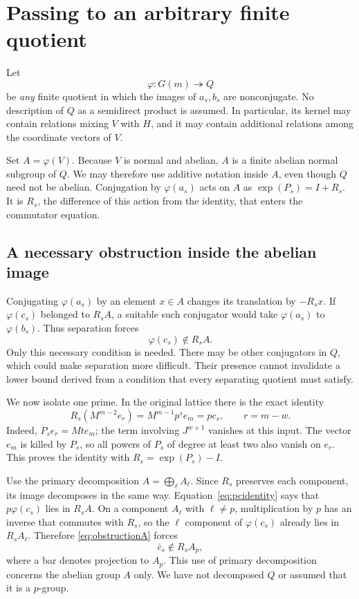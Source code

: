 \documentclass[11pt]{article}
\numberwithin{equation}{section}
\theoremstyle{definition}
\theoremstyle{remark}
\begin{document}
\section{Passing to an arbitrary finite quotient}\label{sec:arbitrary}
Let
\[
\varphi:G(m)\twoheadrightarrow Q
\]
be \emph{any} finite quotient in which the images of $a_s,b_s$ are nonconjugate. No description of $Q$ as a semidirect product is assumed. In particular, its kernel may contain relations mixing $V$ with $H$, and it may contain additional relations among the coordinate vectors of $V$.

Set $A=\varphi(V)$. Because $V$ is normal and abelian, $A$ is a finite abelian normal subgroup of $Q$. We may therefore use additive notation inside $A$, even though $Q$ need not be abelian. Conjugation by $\varphi(a_s)$ acts on $A$ as $\exp(P_s)=I+R_s$. It is $R_s$, the difference of this action from the identity, that enters the commutator equation.

\subsection{A necessary obstruction inside the abelian image}
Conjugating $\varphi(a_s)$ by an element $x\in A$ changes its translation by $-R_sx$. If $\varphi(c_s)$ belonged to $R_sA$, a suitable such conjugator would take $\varphi(a_s)$ to $\varphi(b_s)$. Thus separation forces
\begin{equation}\label{eq:obstructionA}
\varphi(c_s)\notin R_sA.
\end{equation}
Only this necessary condition is needed. There may be other conjugators in $Q$, which could make separation more difficult. Their presence cannot invalidate a lower bound derived from a condition that every separating quotient must satisfy.

We now isolate one prime. In the original lattice there is the exact identity
\begin{equation}\label{eq:pcidentity}
R_s(M^{m-2}e_r)=M^{m-1}p^s e_m=p c_s,
\qquad r=m-w.
\end{equation}
Indeed, $P_s e_r=Mt e_m$; the term involving $J^{w+1}$ vanishes at this input. The vector $e_m$ is killed by $P_s$, so all powers of $P_s$ of degree at least two also vanish on $e_r$. This proves the identity with $R_s=\exp(P_s)-I$.

Use the primary decomposition $A=\bigoplus_\ell A_\ell$. Since $R_s$ preserves each component, its image decomposes in the same way. Equation~\eqref{eq:pcidentity} says that $p\varphi(c_s)$ lies in $R_sA$. On a component $A_\ell$ with $\ell\ne p$, multiplication by $p$ has an inverse that commutes with $R_s$, so the $\ell$ component of $\varphi(c_s)$ already lies in $R_sA_\ell$. Therefore \eqref{eq:obstructionA} forces
\begin{equation}\label{eq:obstructionp}
\bar c_s\notin R_sA_p,
\end{equation}
where a bar denotes projection to $A_p$. This use of primary decomposition concerns the abelian group $A$ only. We have not decomposed $Q$ or assumed that it is a $p$-group.
\end{document}
